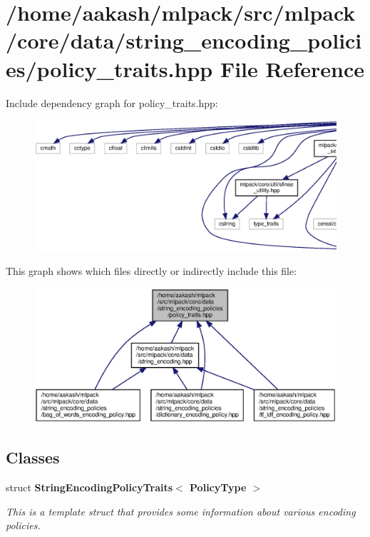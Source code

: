 \section{/home/aakash/mlpack/src/mlpack/core/data/string\+\_\+encoding\+\_\+policies/policy\+\_\+traits.hpp File Reference}
\label{policy__traits_8hpp}
Include dependency graph for policy\+\_\+traits.\+hpp\+:
\nopagebreak
\begin{figure}[H]
\begin{center}
\leavevmode
\includegraphics[width=350pt]{policy__traits_8hpp__incl}
\end{center}
\end{figure}
This graph shows which files directly or indirectly include this file\+:
\nopagebreak
\begin{figure}[H]
\begin{center}
\leavevmode
\includegraphics[width=350pt]{policy__traits_8hpp__dep__incl}
\end{center}
\end{figure}
\subsection*{Classes}
\begin{DoxyCompactItemize}
\item 
struct \textbf{ String\+Encoding\+Policy\+Traits$<$ Policy\+Type $>$}
\begin{DoxyCompactList}\small\item\em This is a template struct that provides some information about various encoding policies. \end{DoxyCompactList}\end{DoxyCompactItemize}
